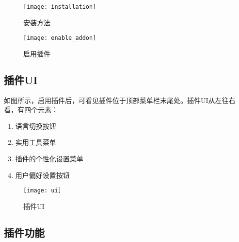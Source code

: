 \documentclass{../../public_resources/doc}
\begin{document}
\begin{figure}[h!]
    \begin{minipage}[t]{0.48\linewidth}
        \texttt{[image: installation]}
        \caption{安装方法}
    \end{minipage}
    \quad
    \begin{minipage}[t]{0.48\linewidth}
        \texttt{[image: enable\_addon]}
        \caption{启用插件}
        \label{启用插件}
    \end{minipage}
\end{figure}

\subsection{插件UI}
\label{插件UI小节}
如图所示，启用插件后，可看见插件位于顶部菜单栏末尾处。插件UI从左往右看，有四个元素：
\begin{enumerate}
    \item 语言切换按钮
    \item 实用工具菜单
    \item 插件的个性化设置菜单
    \item 用户偏好设置按钮
\end{enumerate}

\begin{figure}[h!]
    \texttt{[image: ui]}
    \caption{插件UI}
    \label{插件UI}
\end{figure}

\subsection{插件功能}
\hypertarget{AddonFeatures}{}

\end{document}
